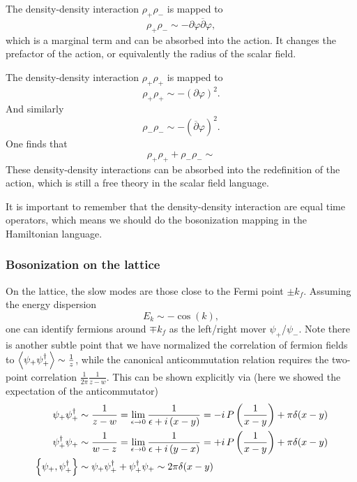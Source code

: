 \documentclass[submission, PhysLectNotes]{SciPost}
\begin{document}
The density-density interaction $\rho_{+} \rho_{-}$ is mapped to 
\begin{equation}
	\rho_{+} \rho_{-} \sim -\partial \varphi \overline{\partial} \varphi,
\end{equation}
which is a marginal term and can be absorbed into the action. It changes the prefactor of the action, or equivalently the radius of the scalar field. 

The density-density interaction $\rho_{+} \rho_{+}$ is mapped to 
\begin{equation}
	\rho_{+} \rho_{+} \sim -{\left(\partial \varphi \right)}^2.
\end{equation}
And similarly 
\begin{equation}
	\rho_{-} \rho_{-} \sim -{\left(\overline{\partial} \varphi \right)}^2.
\end{equation}
One finds that 
\begin{equation}
	\rho_{+}\rho_{+} + \rho_{-} \rho_{-} \sim 
\end{equation}
These density-density interactions can be absorbed into the redefinition of the action, which is still a free theory in the scalar field language.
 
It is important to remember that the density-density interaction are equal time operators, which means we should do the bosonization mapping in the Hamiltonian language. 

\subsubsection{Bosonization on the lattice} 
On the lattice, the slow modes are those close to the Fermi point $\pm k_f$. Assuming the energy dispersion 
\begin{equation}
	E_k \sim -\cos (k),
\end{equation}
one can identify fermions around $\mp k_f$ as the left/right mover $\psi_{+}$/$\psi_{-}$. Note there is another subtle point that we have normalized the correlation of fermion fields to $\expval{\psi_{+}\psi_{+}^\dagger} \sim \frac{1}{z}$, while the canonical anticommutation relation requires the two-point correlation $\frac{1}{2\pi}\frac{1}{z-w}$. This can be shown explicitly via (here we showed the expectation of the anticommutator)
\begin{equation}
	\begin{aligned}
		\psi_{+}\psi_{+}^\dagger & \sim \frac{1}{z-w} = \lim_{\epsilon\rightarrow 0} \frac{1}{\epsilon + i\left(x-y\right)} = -i\,P\left(\frac{1}{x-y}\right) + \pi \delta(x-y)\\
		\psi_{+}^\dagger\psi_{+} & \sim \frac{1}{w-z} = \lim_{\epsilon\rightarrow 0} \frac{1}{\epsilon + i\left(y-x\right)} = +i\,P\left(\frac{1}{x-y}\right) + \pi \delta(x-y)\\
		\anticommutator{\psi_{+}}{\psi_{+}^\dagger} & \sim \psi_{+}\psi_{+}^\dagger + \psi_{+}^\dagger\psi_{+} \sim 2\pi \delta(x-y)
	\end{aligned}
\end{equation}
\end{document}
